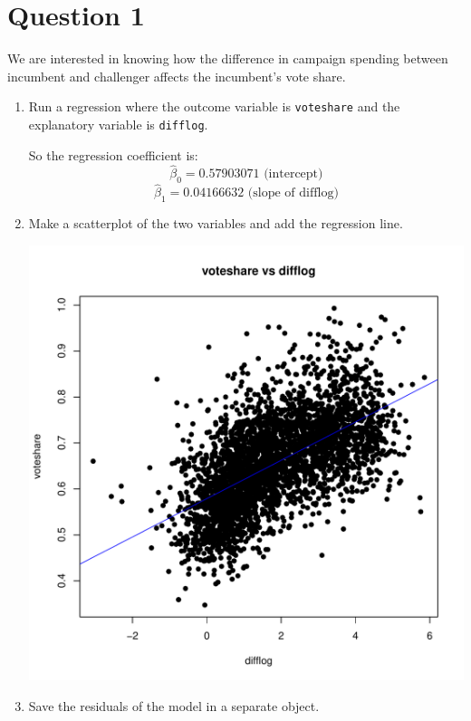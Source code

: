\documentclass[12pt,letterpaper]{article}
\begin{document}
\section*{Question 1}
\vspace{.25cm}
\noindent We are interested in knowing how the difference in campaign spending between incumbent and challenger affects the incumbent's vote share. 
	\begin{enumerate}
		\item Run a regression where the outcome variable is \texttt{voteshare} and the explanatory variable is \texttt{difflog}.	
		\vspace{.5cm}
		
			 
		So the regression coefficient is:\\
		$$
		\hat{\beta}_0 = 0.57903071 \text{ (intercept)}
		$$
		$$
		\hat{\beta}_1 = 0.04166632 \text{ (slope of difflog)}
		$$
		\vspace{.5cm}
		
		\item Make a scatterplot of the two variables and add the regression line. 	
		\vspace{.5cm}
		
		 
		  \begin{center}
			\includegraphics[width=0.7\linewidth]{"scatter_plot1"}
		\end{center}
		
		\item Save the residuals of the model in a separate object.	
		\vspace{.5cm}
		

\end{enumerate}
\end{document}
